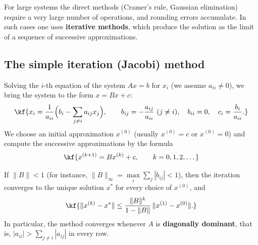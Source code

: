 
For large systems the direct methods (Cramer’s rule, Gaussian elimination)
require a very large number of operations, and rounding errors accumulate.
In such cases one uses \textbf{iterative methods}, which produce the solution
as the limit of a sequence of successive approximations.

\subsection{The simple iteration (Jacobi) method}

\begin{tarif}
Solving the $i$-th equation of the system $Ax=b$ for $x_i$ (we assume
$a_{ii}\neq0$), we bring the system to the form $x=Bx+c$:
\[\kf{x_i=\frac{1}{a_{ii}}\Big(b_i-\sum\limits_{j\neq i}a_{ij}x_j\Big),\qquad
b_{ij}=-\frac{a_{ij}}{a_{ii}}\ (j\neq i),\quad b_{ii}=0,\quad c_i=\frac{b_i}{a_{ii}} .}\]
We choose an initial approximation $x^{(0)}$ (usually $x^{(0)}=c$ or
$x^{(0)}=0$) and compute the successive approximations by the formula
\[\kf{x^{(k+1)}=Bx^{(k)}+c,\qquad k=0,1,2,\dots}\]
\end{tarif}

\begin{teorema}
If $\|B\|<1$ (for instance,
$\|B\|_\infty=\max\limits_i\sum\limits_j|b_{ij}|<1$), then the iteration
converges to the unique solution $x^*$ for every choice of $x^{(0)}$, and
\[\kf{\|x^{(k)}-x^*\|\leq\frac{\|B\|^k}{1-\|B\|}\,\|x^{(1)}-x^{(0)}\|.}\]
In particular, the method converges whenever $A$ is \textbf{diagonally dominant},
that is, $|a_{ii}|>\sum\limits_{j\neq i}|a_{ij}|$ in every row.
\end{teorema}

